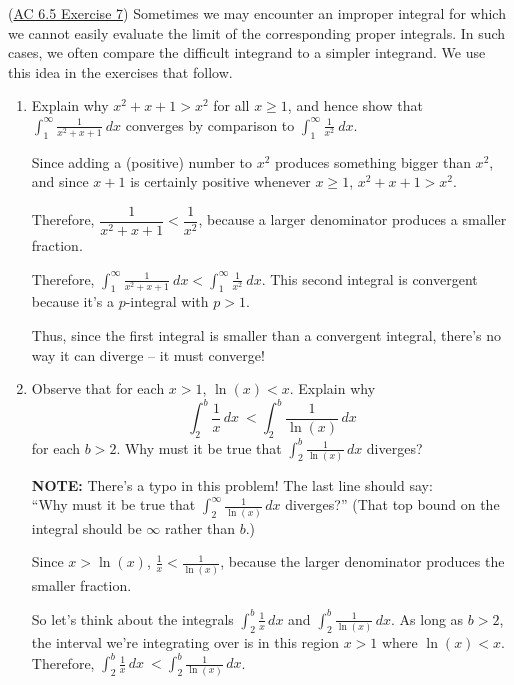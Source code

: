 \item (\href{https://activecalculus.org/single/sec-6-5-improper.html#Hfn}{AC 6.5 Exercise 7})
Sometimes we may encounter an improper integral for which we cannot easily evaluate the limit of the corresponding proper integrals. In such cases, we often compare the difficult integrand to a simpler integrand. We use this idea in the exercises that follow.

\begin{enumerate}
    \item Explain why $x^2 + x + 1 > x^2$ for all $x \geq 1$, and hence show that $\int_1^\infty \frac{1}{x^2 + x + 1}\ dx$ converges by comparison to $\int_1^\infty \frac1{x^2}\ dx$.
    
    \begin{red}
    Since adding a (positive) number to $x^2$ produces something bigger than $x^2$, and since $x+1$ is certainly positive whenever $x \geq 1$, $x^2 + x + 1 > x^2$.
    
    Therefore, $\dfrac{1}{x^2 + x + 1} < \dfrac{1}{x^2}$, because a larger denominator produces a smaller fraction. 
    
    Therefore, $\displaystyle \int_1^\infty \frac{1}{x^2 + x + 1}\ dx < \int_1^\infty \frac{1}{x^2}\ dx$. This second integral is convergent because it's a $p$-integral with $p>1$.
    
    Thus, since the first integral is smaller than a convergent integral, there's no way it can diverge -- it must converge!
    \end{red}
    
    \item Observe that for each $x>1$, $\ln(x) < x$. Explain why \[\int_2^b \frac{1}{x} \, dx \ <  \int_2^b \frac{1}{\ln(x)} \,dx\] for each $b > 2$. Why must it be true that $\int_2^b \frac{1}{\ln(x)} \,dx$ diverges?
    
    \begin{blue}
    \textbf{NOTE:} There's a typo in this problem! The last line should say:\\
    ``Why must it be true that $\int_2^\infty \frac{1}{\ln(x)} \,dx$ diverges?'' (That top bound on the integral should be $\infty$ rather than $b$.)
    \end{blue}
    
    \begin{red}
    Since $x > \ln(x)$, $\frac{1}{x} < \frac{1}{\ln(x)}$, because the larger denominator produces the smaller fraction. 
    
    So let's think about the integrals $\int_2^b \frac{1}{x} \, dx $ and $  \int_2^b \frac{1}{\ln(x)} \,dx$. As long as $b > 2$, the interval we're integrating over is in this region $x > 1$ where $\ln(x) < x$. Therefore, $\int_2^b \frac{1}{x} \, dx \ <  \int_2^b \frac{1}{\ln(x)} \,dx$.
    

\end{red}
\end{enumerate}
